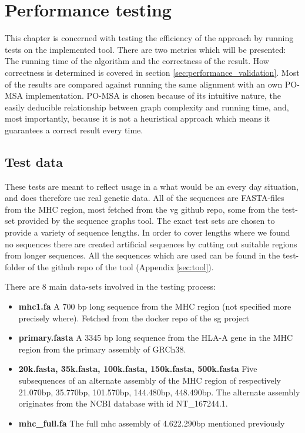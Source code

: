 \documentclass[thesis.tex]{subfiles}
\begin{document}
\chapter{Performance testing}
This chapter is concerned with testing the efficiency of the approach by running tests on the implemented tool. There are two metrics which will be presented: The running time of the algorithm and the correctness of the result. How correctness is determined is covered in section \ref{sec:performance_validation}. Most of the results are compared against running the same alignment with an own PO-MSA implementation. PO-MSA is chosen because of its intuitive nature, the easily deducible relationship between graph complexity and running time, and, most importantly, because it is not a heuristical approach which means it guarantees a correct result every time.
\section{Test data}
These tests are meant to reflect usage in a what would be an every day situation, and does therefore use real genetic data. All of the sequences are FASTA-files from the MHC region, most fetched from the vg github repo\cite{vg}, some from the test-set provided by the sequence graphs tool\cite{sequence_graphs}. The exact test sets are chosen to provide a variety of sequence lengths. In order to cover lengths where we found no sequences there are created artificial sequences by cutting out suitable regions from longer sequences. All the sequences which are used can be found in the test-folder of the github repo of the tool (Appendix \ref{sec:tool}).\\
\par\noindent
There are 8 main data-sets involved in the testing process:
\begin{itemize}
  \item \textbf{mhc1.fa} A 700 bp long sequence from the MHC region (not specified more precisely where). Fetched from the docker repo of the sg project
  \item \textbf{primary.fasta} A 3345 bp long sequence from the HLA-A gene in the MHC region from the primary assembly of GRCh38.
  \item \textbf{20k.fasta, 35k.fasta, 100k.fasta, 150k.fasta, 500k.fasta} Five subsequences of an alternate assembly of the MHC region of respectively 21.070bp, 35.770bp, 101.570bp, 144.480bp, 448.490bp. The alternate assembly originates from the NCBI database\cite{ncbi} with id NT\_167244.1.
  \item \textbf{mhc\_full.fa} The full mhc assembly of 4.622.290bp mentioned previously
\end{itemize}
\end{document}
